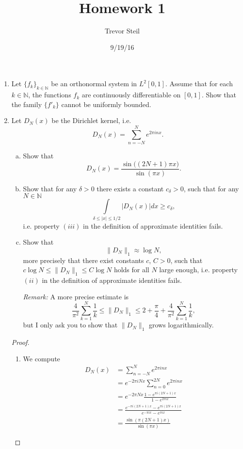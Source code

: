 \documentclass[a4paper]{article}
\title{Homework 1 }
\date{9/19/16}
\author{Trevor Steil}
\begin{document}
\maketitle

\begin{enumerate}

\item Let $\{ f_k \}_{k\in \mathbb N}$ be an orthonormal system in $L^2 [0,1]$. Assume that for each $k\in \mathbb N$, the functions $f_k$ are continuously differentiable on $[0,1]$. Show that the family $\{ f'_k \}$ cannot be uniformly bounded.

\item Let $D_N (x)$ be the Dirichlet kernel, i.e. $$ D_N (x) = \sum_{n=-N}^N e^{2\pi i nx}. $$

\begin{enumerate}[(a)]
\item Show that $$ D_N (x)  = \frac{\sin \big( (2N+1) \pi x\big)}{ \sin (\pi x)}. $$
\item Show that for any $\delta > 0$ there exists a constant $c_\delta >0$, such that for any $N \in \mathbb N$ $$ \int\limits_{\delta \le |x| \le 1/2} |D_N (x) | dx \ge c_\delta,$$
i.e. property $(iii)$ in the definition of approximate identities fails.
\item Show that   $$ \| D_N \|_1 \approx \log N,$$ more precisely that there exist constants $c$, $C>0$, such that $ c\log N \le  \| D_N \|_1 \le C \log N$ holds for all $N$ large enough,  i.e. property $(ii)$ in the definition of approximate identities fails.

{\it{Remark:}}  A more precise estimate is $$ \frac{4}{\pi^2} \sum_{k=1}^N \frac1{k} \le \| D_N \|_1 \le 2 + \frac{\pi}{4} +   \frac{4}{\pi^2} \sum_{k=1}^N \frac1{k},$$ but I only ask you to show that $\| D_N \|_1$ grows logarithmically.
\end{enumerate}

\begin{proof}
  \begin{enumerate}
    \item
      We compute
      \begin{align*}
        D_N(x) &= \sum_{n=-N}^N e^{2 \pi i n x} \\
        &= e^{-2 \pi i N x} \sum_{n=0}^{2N} e^{2 \pi i n x} \\
        &= e^{-2 \pi N x} \frac{1 - e^{\pi i (2N+1)x}}{1 - e^{2 \pi i x}} \\
        &= \frac{e^{-\pi i (2N+1)x} - e^{\pi i (2N+1) x}}{ e^{-\pi i x} - e^{ \pi i x}} \\
        &= \frac{\sin \left( \pi (2N+1)x \right)}{\sin \left( \pi x \right)}
      \end{align*}


\end{enumerate}
\end{proof}
\end{enumerate}
\end{document}
